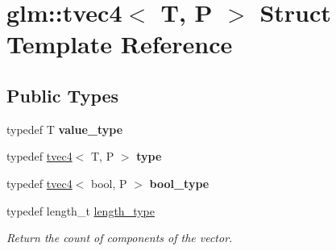 \hypertarget{structglm_1_1tvec4}{}\section{glm\+:\+:tvec4$<$ T, P $>$ Struct Template Reference}
\label{structglm_1_1tvec4}
\subsection*{Public Types}
\begin{DoxyCompactItemize}
\item 
\mbox{\label{structglm_1_1tvec4_ac6521112942e4500f26c0c0799b2cfa9}} 
typedef T {\bfseries value\+\_\+type}
\item 
\mbox{\label{structglm_1_1tvec4_a8896f36a5499c8908772db7faf59e981}} 
typedef \hyperlink{structglm_1_1tvec4}{tvec4}$<$ T, P $>$ {\bfseries type}
\item 
\mbox{\label{structglm_1_1tvec4_aace03487e0707681ffa197d4e844501b}} 
typedef \hyperlink{structglm_1_1tvec4}{tvec4}$<$ bool, P $>$ {\bfseries bool\+\_\+type}
\item 
\mbox{\label{structglm_1_1tvec4_a4e2b34a427cac7e72b6f73173c206feb}} 
typedef length\+\_\+t \hyperlink{structglm_1_1tvec4_a4e2b34a427cac7e72b6f73173c206feb}{length\+\_\+type}
\begin{DoxyCompactList}\small\item\em Return the count of components of the vector. \end{DoxyCompactList}\end{DoxyCompactItemize}
